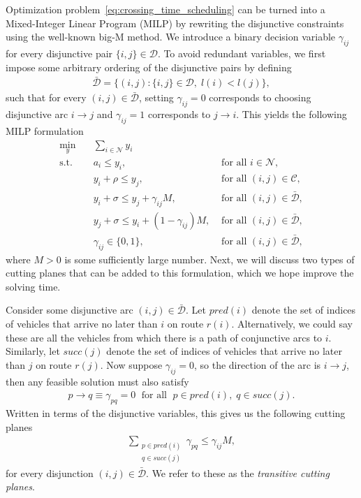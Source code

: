 \documentclass[a4paper]{article}
\theoremstyle{definition}
\theoremstyle{plain}
\begin{document}
Optimization problem~\eqref{eq:crossing_time_scheduling} can be turned into
a Mixed-Integer Linear Program (MILP) by rewriting the disjunctive constraints using
the well-known big-M method.
%
We introduce a binary decision variable $\gamma_{ij}$ for every
disjunctive pair $\{i, j\} \in \mathcal{D}$.
%
To avoid redundant variables, we first impose some arbitrary ordering of the
disjunctive pairs by defining
\begin{align*}
  \bar{\mathcal{D}} = \{ (i,j) : \{i,j\} \in \mathcal{D}, \; l(i) < l(j) \} ,
\end{align*}
such that for every $(i,j) \in \bar{\mathcal{D}}$, setting $\gamma_{ij} = 0$
corresponds to choosing disjunctive arc $i \rightarrow j$ and
$\gamma_{ij} = 1$ corresponds to $j \rightarrow i$. This yields the following
MILP formulation
%
\begin{align*}
  \min_{y} \quad & \sum_{i \in \mathcal{N}} y_{i} & \\
  \text{s.t.} \quad & a_{i} \leq y_{i} , & \text{ for all } i \in \mathcal{N} , \\
  & y_{i} + \rho \leq y_{j} , & \text{ for all } (i,j) \in \mathcal{C} , \\
  & y_{i} + \sigma \leq y_{j} + \gamma_{ij}M , & \text{ for all } (i,j) \in \bar{\mathcal{D}} , \\
  & y_{j} + \sigma \leq y_{i} + (1 - \gamma_{ij})M , & \text{ for all } (i,j) \in \bar{\mathcal{D}} , \\
  & \gamma_{ij} \in \{0, 1\} , & \text{ for all } (i,j) \in \bar{\mathcal{D}} ,
\end{align*}
where $M > 0$ is some sufficiently large number. Next, we will discuss two
types of cutting planes that can be added to this formulation, which we hope
improve the solving time.

Consider some disjunctive arc $(i,j) \in \bar{\mathcal{D}}$. Let
$\mathit{pred}(i)$ denote the set of indices of vehicles that arrive no later
than $i$ on route $r(i)$. Alternatively, we could say
these are all the vehicles from which there is a path of conjunctive arcs to
$i$. Similarly, let $\mathit{succ}(j)$ denote the set of indices of vehicles
that arrive no later than $j$ on route $r(j)$.
%
Now suppose $\gamma_{ij} = 0$, so the direction of the arc is $i \rightarrow j$,
then any feasible solution must also satisfy
\begin{align*}
  p \rightarrow q \equiv \gamma_{pq} = 0 \; \text{ for all } \; p \in \mathit{pred}(i), \; q \in \mathit{succ}(j) .
\end{align*}
Written in terms of the disjunctive variables, this gives us the following cutting planes
\begin{align*}
  \sum_{\substack{p \in \mathit{pred}(i)\\ q \in \mathit{succ}(j)}} \gamma_{pq} \leq \gamma_{ij} M ,
\end{align*}
for every disjunction $(i,j) \in \bar{\mathcal{D}}$. We refer to these as
the \textit{transitive cutting planes}.
\end{document}
